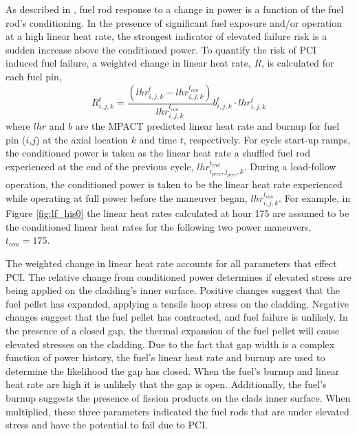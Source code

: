 \documentclass[edeposit,fullpage,11pt]{uiucthesis2009}
\begin{document}
As described in \cite{capps_evaluation_2016,kennard_pci_2016}, fuel rod response to a change in power is a function of the fuel rod's conditioning. 
In the presence of significant fuel exposure and/or operation at a high linear heat rate, the strongest indicator of elevated failure risk is a sudden increase above the conditioned power.
To quantify the risk of \gls{PCI} induced fuel failure, a weighted change in linear heat rate, $R$, is calculated for each fuel pin,
\begin{equation}
R_{i,j,k}^{t} = \frac{\left( lhr_{i,j,k}^t-lhr_{i,j,k}^{t_{con}}\right)}{lhr_{i,j,k}^{t_{con}}} b_{i,j,k}^t \cdot lhr_{i,j,k}^{t}
\end{equation}
where $lhr$ and $b$ are the MPACT predicted linear heat rate and burnup for fuel pin ($i$,$j$) at the axial location $k$ and time $t$, respectively.
For cycle start-up ramps, the conditioned power is taken as the linear heat rate a shuffled fuel rod experienced at the end of the previous cycle, $lhr_{i_{prev},j_{prev},k}^{t_{end}}$.
During a load-follow operation, the conditioned power is taken to be the linear heat rate experienced while operating at full power before the maneuver began, $lhr_{i,j,k}^{t_{con}}$.
For example, in Figure \ref{fig:lf_his0} the linear heat rates calculated at hour 175 are assumed to be the conditioned linear heat rates for the following two power maneuvers, $t_{con}=175$. 

The weighted change in linear heat rate accounts for all parameters that effect \gls{PCI}.
The relative change from conditioned power determines if elevated stress are being applied on the cladding's inner surface.
Positive changes suggest that the fuel pellet has expanded, applying a tensile hoop stress on the cladding.
Negative changes suggest that the fuel pellet has contracted, and fuel failure is unlikely.
In the presence of a closed gap, the thermal expansion of the fuel pellet will cause elevated stresses on the cladding.
Due to the fact that gap width is a complex function of power history, the fuel's linear heat rate and burnup are used to determine the likelihood the gap has closed.
When the fuel's burnup and linear heat rate are high it is unlikely that the gap is open.
Additionally, the fuel's burnup suggests the presence of fission products on the clads inner surface.
When multiplied, these three parameters indicated the fuel rods that are under elevated stress and have the potential to fail due to \gls{PCI}.
\end{document}

